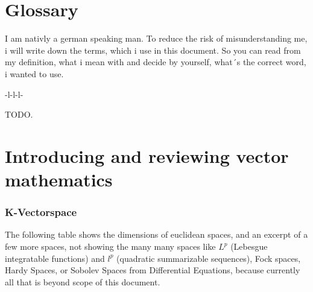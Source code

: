 \documentclass[a4paper]{article}
\begin{document}
\section{Glossary}

I am nativly a german speaking man. To reduce the risk of misunderstanding me, i will write down the terms, which i use in this document. So you can read from my definition, what i mean with and decide by yourself, what´s the correct word, i wanted to use.\\



\begin{tabular}{-l-l-l-}

\end{tabular}

TODO.

\appendix

\section{Introducing and reviewing vector mathematics}

\subsubsection{K-Vectorspace}

The following table shows the dimensions of euclidean spaces, and an excerpt of a few more spaces, not showing the many many spaces like $L^{p}$ (Lebesgue integratable functions) and $l^{p}$ (quadratic summarizable sequences), Fock spaces, Hardy Spaces, or Sobolev Spaces from Differential Equations, because currently all that is beyond scope of this document. 
\end{document}
